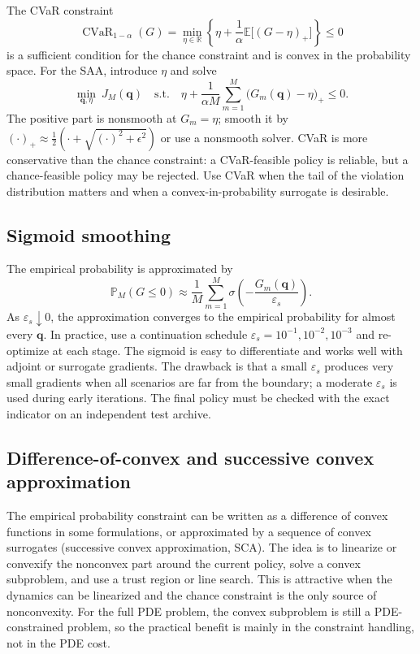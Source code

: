 \documentclass[11pt]{article}
\numberwithin{equation}{section}
\newcommand{\R}{\mathbb{R}}
\newcommand{\E}{\mathbb{E}}
\newcommand{\Prob}{\mathbb{P}}
\newcommand{\qq}{\mathbf{q}}
\newcommand{\CVaR}{\operatorname{CVaR}}
\theoremstyle{plain}
\begin{document}
The CVaR constraint
\begin{equation}
\label{eq:cvar}
\CVaR_{1-\alpha}(G)
=\min_{\eta\in\R}\left\{
\eta+\frac{1}{\alpha}\E\bigl[(G-\eta)_+\bigr]
\right\}\le0
\end{equation}
is a sufficient condition for the chance constraint and is convex in the
probability space.  For the SAA, introduce $\eta$ and solve
\begin{equation}
\label{eq:cvar-saa}
\min_{\qq,\eta}\ J_M(\qq)
\quad\text{s.t.}\quad
\eta+\frac{1}{\alpha M}\sum_{m=1}^{M}
\bigl(G_m(\qq)-\eta\bigr)_+\le0.
\end{equation}
The positive part is nonsmooth at $G_m=\eta$; smooth it by
$(\cdot)_+\approx\frac{1}{2}(\cdot+\sqrt{(\cdot)^2+\epsilon^2})$ or use a
nonsmooth solver.  CVaR is more conservative than the chance constraint: a
CVaR-feasible policy is reliable, but a chance-feasible policy may be rejected.
Use CVaR when the tail of the violation distribution matters and when a
convex-in-probability surrogate is desirable.

\subsection{Sigmoid smoothing}

The empirical probability is approximated by
\begin{equation}
\label{eq:sigmoid}
\Prob_M(G\le0)
\approx\frac{1}{M}\sum_{m=1}^{M}
\sigma\!\left(-\frac{G_m(\qq)}{\varepsilon_s}\right).
\end{equation}
As $\varepsilon_s\downarrow0$, the approximation converges to the empirical
probability for almost every $\qq$.  In practice, use a continuation schedule
$\varepsilon_s=10^{-1},10^{-2},10^{-3}$ and re-optimize at each stage.  The
sigmoid is easy to differentiate and works well with adjoint or surrogate
gradients.  The drawback is that a small $\varepsilon_s$ produces very small
gradients when all scenarios are far from the boundary; a moderate
$\varepsilon_s$ is used during early iterations.  The final policy must be
checked with the exact indicator on an independent test archive.

\subsection{Difference-of-convex and successive convex approximation}

The empirical probability constraint can be written as a difference of convex
functions in some formulations, or approximated by a sequence of convex
surrogates (successive convex approximation, SCA).  The idea is to linearize
or convexify the nonconvex part around the current policy, solve a convex
subproblem, and use a trust region or line search.  This is attractive when
the dynamics can be linearized and the chance constraint is the only source of
nonconvexity.  For the full PDE problem, the convex subproblem is still a
PDE-constrained problem, so the practical benefit is mainly in the constraint
handling, not in the PDE cost.
\end{document}
